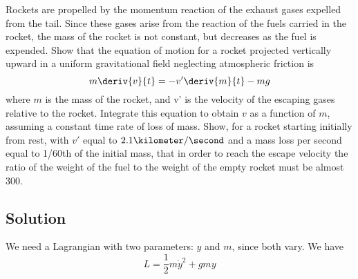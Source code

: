 Rockets are propelled by the momentum reaction of the exhaust gases
expelled from the tail.  Since these gases arise from the reaction of
the fuels carried in the rocket, the mass of the rocket is not
constant, but decreases as the fuel is expended.  Show that the
equation of motion for a rocket projected vertically upward in a
uniform gravitational field neglecting atmospheric friction is
\[m\deriv{v}{t} = -v'\deriv{m}{t} - mg\]
where $m$ is the mass of the rocket, and v' is the velocity of the
escaping gases relative to the rocket.  Integrate this equation to
obtain $v$ as a function of $m$, assuming a constant time rate of loss
of mass.  Show, for a rocket starting initially from rest, with $v'$
equal to $2.1 \kilometer/\second$ and a mass loss per second equal to
1/60th of the initial mass, that in order to reach the escape velocity
the ratio of the weight of the fuel to the weight of the empty rocket
must be almost 300.

\subsection*{Solution}
We need a Lagrangian with two parameters: $y$ and $m$, since both
vary.  We have
\[ L = \frac{1}{2}m\dot{y}^2 + gmy \]

